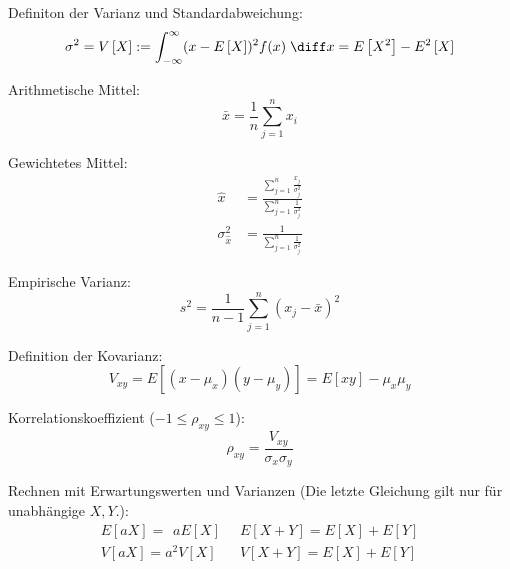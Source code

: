 \documentclass[11pt]{article}
\numberwithin{equation}{section}
\begin{document}
				\noindent
				Definiton der Varianz und Standardabweichung:
				\begin{equation}
					\sigma^2 = V\left[ X \right] := \int_{-\infty}^{\infty} (x-E\left[X\right])^2f(x)\;\diff x = E\left[X^2\right]-E^2\left[X\right]
				\end{equation}

				\noindent
				Arithmetische Mittel:
				\begin{equation}
					\bar{x}=\frac{1}{n}\sum_{j=1}^n x_i
				\end{equation}

				\noindent
				Gewichtetes Mittel:
				\begin{equation}
					\begin{aligned}
						\hat{x} &= \frac{\sum_{j=1}^n \frac{x_j}{\sigma_j^2}}{\sum_{j=1}^n \frac{1}{\sigma_j^2}} \\
						\sigma_{\hat{x}}^2 &= \frac{1}{\sum_{j=1}^n \frac{1}{\sigma_j^2}}
					\end{aligned}
				\end{equation}

				\noindent
				Empirische Varianz:
				\begin{equation}
					s^2 = \frac{1}{n-1}\sum_{j=1}^n (x_j-\bar{x})^2
				\end{equation}

				\noindent
				Definition der Kovarianz:
				\begin{equation}
					V_{xy} = E\left[(x-\mu_x)(y-\mu_y)\right] = E\left[xy\right]-\mu_x\mu_y
				\end{equation}

				\noindent
				Korrelationskoeffizient ($-1\le\rho_{xy}\le 1$):
				\begin{equation}
					\rho_{xy} = \frac{V_{xy}}{\sigma_x\sigma_y}
				\end{equation}

				\noindent
				Rechnen mit Erwartungswerten und Varianzen (Die letzte Gleichung gilt nur für unabhängige $X, Y$.):
				\begin{equation}
					\begin{array}{rl}
						E\left[aX\right] = \phantom{^2}a E\left[X\right]
						&\;\;
						E\left[X+Y\right] = E\left[X\right] + E\left[Y\right]
						\\
						V\left[aX\right] = a^2 V\left[X\right]
						&\;\;
						V\left[X+Y\right] = E\left[X\right] + E\left[Y\right]
						\\
					\end{array}
				\end{equation}
\end{document}
